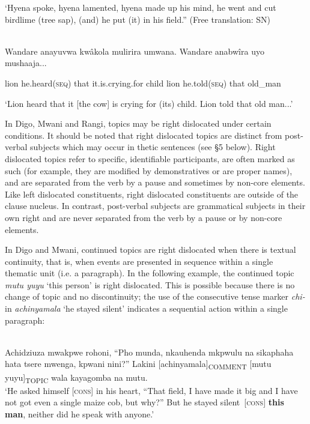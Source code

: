 \documentclass[output=paper]{langsci/langscibook}
\begin{document}
\begin{styleLangSciTranslation}\upshape
‘Hyena spoke, hyena lamented, hyena made up his mind, he went and cut birdlime (tree sap), (and) he put (it) in his field.” (Free translation: SN)
\z

\ea\label{ex:}
\\
\gll Wandare anayuvwa kwâkola mulirira umwana. Wandare anabwîra uyo mushaaja...\\
\begin{styleUntitledi}
lion he.heard(\textsc{seq}) that it.is.crying.for child lion he.told(\textsc{seq}) that old\_man  
\end{styleUntitledi}

\glt \textup{‘}\textup{Lion heard that it [the cow] is crying for (its) child. Lion told that old man...’}
\z

In Digo, Mwani and Rangi, topics may be right dislocated under certain conditions. It should be noted that right dislocated topics are distinct from post-verbal subjects which may occur in thetic sentences (see §5 below). Right dislocated topics refer to specific, identifiable participants, are often marked as such (for example, they are modified by demonstratives or are proper names), and are separated from the verb by a pause and sometimes by non-core elements. Like left dislocated constituents, right dislocated constituents are outside of the clause nucleus. In contrast, post-verbal subjects are grammatical subjects in their own right and are never separated from the verb by a pause or by non-core elements.

In Digo and Mwani, continued topics are right dislocated when there is textual continuity, that is, when events are presented in sequence within a single thematic unit (i.e. a paragraph). In the following example, the continued topic \textit{mutu yuyu} ‘this person’ is right dislocated. This is possible because there is no change of topic and no discontinuity; the use of the consecutive tense marker \textit{chi}\textit{\nobreakdash-} in \textit{a}\textit{chi}\textit{nyamala} ‘he stayed silent’ indicates a sequential action within a single paragraph:

\ea\label{ex:}
\\
\gll Achidziuza mwakpwe rohoni, “Pho munda, nkauhenda mkpwulu na sikaphaha hata tsere mwenga, kpwani nini?” Lakini [achinyamala]\textsubscript{COMMENT} [mutu yuyu]\textsubscript{TOPIC} wala kayagomba na mutu.\\
\glt \textup{‘}\textup{He}\textup{ asked himself [}\textsc{cons}\textup{] in his heart, “That field, I have made it big and I have not got even a single maize cob, but why?” But }\textup{he stayed silent}\textup{~[}\textsc{cons}\textup{] }\textbf{\textup{this man}}\textup{, neither did he speak with anyone.’}
\z


\end{styleLangSciTranslation}
\end{document}
